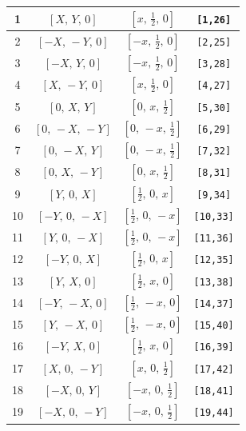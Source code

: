 \documentclass[fleqn,8pt]{jsarticle}
\begin{document}
\begin{longtable}{cccc}
1 & $\left[ X,\, Y,\, 0 \right]$ & $\left[ x,\, \frac{1}{2},\, 0 \right]$ & {\tt [1,26]} \\ \hline
2 & $\left[ - X,\, - Y,\, 0 \right]$ & $\left[ - x,\, \frac{1}{2},\, 0 \right]$ & {\tt [2,25]} \\ \hline
3 & $\left[ - X,\, Y,\, 0 \right]$ & $\left[ - x,\, \frac{1}{2},\, 0 \right]$ & {\tt [3,28]} \\ \hline
4 & $\left[ X,\, - Y,\, 0 \right]$ & $\left[ x,\, \frac{1}{2},\, 0 \right]$ & {\tt [4,27]} \\ \hline
5 & $\left[ 0,\, X,\, Y \right]$ & $\left[ 0,\, x,\, \frac{1}{2} \right]$ & {\tt [5,30]} \\ \hline
6 & $\left[ 0,\, - X,\, - Y \right]$ & $\left[ 0,\, - x,\, \frac{1}{2} \right]$ & {\tt [6,29]} \\ \hline
7 & $\left[ 0,\, - X,\, Y \right]$ & $\left[ 0,\, - x,\, \frac{1}{2} \right]$ & {\tt [7,32]} \\ \hline
8 & $\left[ 0,\, X,\, - Y \right]$ & $\left[ 0,\, x,\, \frac{1}{2} \right]$ & {\tt [8,31]} \\ \hline
9 & $\left[ Y,\, 0,\, X \right]$ & $\left[ \frac{1}{2},\, 0,\, x \right]$ & {\tt [9,34]} \\ \hline
10 & $\left[ - Y,\, 0,\, - X \right]$ & $\left[ \frac{1}{2},\, 0,\, - x \right]$ & {\tt [10,33]} \\ \hline
11 & $\left[ Y,\, 0,\, - X \right]$ & $\left[ \frac{1}{2},\, 0,\, - x \right]$ & {\tt [11,36]} \\ \hline
12 & $\left[ - Y,\, 0,\, X \right]$ & $\left[ \frac{1}{2},\, 0,\, x \right]$ & {\tt [12,35]} \\ \hline
13 & $\left[ Y,\, X,\, 0 \right]$ & $\left[ \frac{1}{2},\, x,\, 0 \right]$ & {\tt [13,38]} \\ \hline
14 & $\left[ - Y,\, - X,\, 0 \right]$ & $\left[ \frac{1}{2},\, - x,\, 0 \right]$ & {\tt [14,37]} \\ \hline
15 & $\left[ Y,\, - X,\, 0 \right]$ & $\left[ \frac{1}{2},\, - x,\, 0 \right]$ & {\tt [15,40]} \\ \hline
16 & $\left[ - Y,\, X,\, 0 \right]$ & $\left[ \frac{1}{2},\, x,\, 0 \right]$ & {\tt [16,39]} \\ \hline
17 & $\left[ X,\, 0,\, - Y \right]$ & $\left[ x,\, 0,\, \frac{1}{2} \right]$ & {\tt [17,42]} \\ \hline
18 & $\left[ - X,\, 0,\, Y \right]$ & $\left[ - x,\, 0,\, \frac{1}{2} \right]$ & {\tt [18,41]} \\ \hline
19 & $\left[ - X,\, 0,\, - Y \right]$ & $\left[ - x,\, 0,\, \frac{1}{2} \right]$ & {\tt [19,44]} \\ \hline

\end{longtable}
\end{document}
